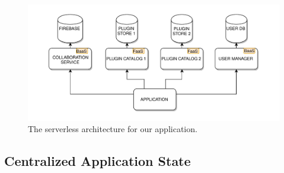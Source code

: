 \begin{figure}[htb]
\centering
\includegraphics[width=\linewidth]{contents/images/serverless-diagram}

\caption{The serverless architecture for our application.}
\label{fig_serverless}
\end{figure}



\subsection{Centralized Application State}\label{ssub:centr_state}

